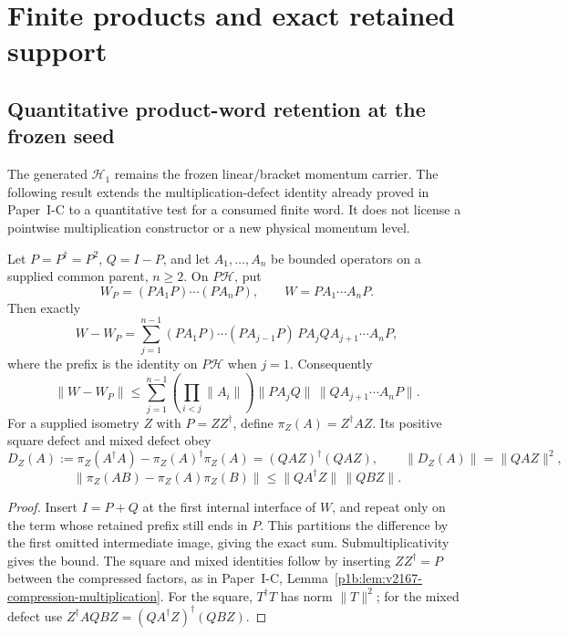 \documentclass[12pt,a4paper]{article}
\begin{document}
\section{Finite products and exact retained support}
\label{paper2b:sec:organized-finite}

\subsection{Quantitative product-word retention at the frozen seed}
\label{p2b:sec:v2210-lit-product-retention}
The generated $\mathcal H_1$ remains the frozen linear/bracket momentum
carrier.  The following result extends the multiplication-defect identity
already proved in Paper~I-C to a quantitative test for a consumed finite
word.  It does not license a pointwise multiplication constructor or a new
physical momentum level.

\begin{theorem}
\label{p2b:thm:v2210-lit-word-defect}
Let $P=P^\dagger=P^2$, $Q=I-P$, and let $A_1,\ldots,A_n$ be bounded
operators on a supplied common parent, $n\ge2$.  On $P\mathcal H$, put
\[
 W_P=(PA_1P)\cdots(PA_nP),\qquad W=P A_1\cdots A_n P.
\]
Then exactly
\[
 W-W_P=\sum_{j=1}^{n-1}
 (PA_1P)\cdots(PA_{j-1}P)\,PA_jQ A_{j+1}\cdots A_nP,
\]
where the prefix is the identity on $P\mathcal H$ when $j=1$.  Consequently
\[
 \|W-W_P\|\le\sum_{j=1}^{n-1}
 \left(\prod_{i<j}\|A_i\|\right)
 \|PA_jQ\|\,\|QA_{j+1}\cdots A_nP\|.
\]
For a supplied isometry $Z$ with $P=ZZ^\dagger$, define
$\pi_Z(A)=Z^\dagger AZ$.  Its positive square defect and mixed defect obey
\[
 D_Z(A):=\pi_Z(A^\dagger A)-\pi_Z(A)^\dagger\pi_Z(A)
 =(QAZ)^\dagger(QAZ),
 \qquad \|D_Z(A)\|=\|QAZ\|^2,
\]
\[
 \|\pi_Z(AB)-\pi_Z(A)\pi_Z(B)\|
 \le\|QA^\dagger Z\|\,\|QBZ\|.
\]
\end{theorem}
\begin{proof}
Insert $I=P+Q$ at the first internal interface of $W$, and repeat only on
the term whose retained prefix still ends in $P$.  This partitions the
difference by the first omitted intermediate image, giving the exact sum.
Submultiplicativity gives the bound.  The square and mixed identities
follow by inserting $ZZ^\dagger=P$ between the compressed factors, as in
Paper~I-C, Lemma~\ref{p1b:lem:v2167-compression-multiplication}.
For the square, $T^\dagger T$ has norm $\|T\|^2$; for the mixed defect
use $Z^\dagger AQBZ=(QA^\dagger Z)^\dagger(QBZ)$.
\end{proof}
\end{document}

